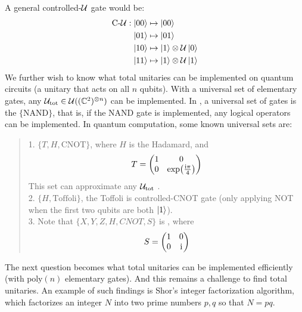 A general controlled-$\mathcal{U}$ gate would be:
\begin{align*}
    \text{C-}\mathcal{U}: \ket{00} &\mapsto \ket{00} \\\
    \ket{01} &\mapsto \ket{01} \\
    \ket{10} &\mapsto \ket{1} \otimes \mathcal{U}\ket{0} \\
    \ket{11} &\mapsto \ket{1} \otimes \mathcal{U}\ket{1}
\end{align*}
We further wish to know what total unitaries can be implemented on quantum circuits (a unitary that acts on all $n$ qubits). With a universal set of elementary gates, any $\mathcal{U}_{\text{tot}} \in \mathcal{U}((\mathbb{C}^2)^{\otimes n})$ can be implemented. In , a universal set of gates is the $\{\text{NAND}\}$, that is, if the NAND gate is implemented, any logical operators can be implemented. In quantum computation, some known universal sets are:
\begin{quote}
    1. $\{T, H, \text{CNOT}\}$, where $H$ is the Hadamard, and
    $$T = \begin{pmatrix}
        1 & 0 \\ 0 & \exp(\frac{\mathrm{i} \pi}{4})
    \end{pmatrix}$$
    This set can approximate any $\mathcal{U}_{\text{tot}}$ . \\
    2. $\{H, \text{Toffoli}\}$, the Toffoli is controlled-CNOT gate (only applying NOT when the first two qubits are both $\ket{1}$). \\
    3. Note that $\{X, Y, Z, H, CNOT, S\}$ is \impt{not universal}, where
    $$S = \begin{pmatrix}
        1 & 0 \\ 0 & \mathrm{i}
    \end{pmatrix}$$
\end{quote}
The next question becomes what total unitaries can be implemented efficiently (with $\text{poly}(n)$ elementary gates). And this remains a challenge to find  total unitaries. An example of such findings is Shor's integer factorization algorithm, which factorizes an integer $N$ into two prime numbers $p, q$ so that $N = pq$.

